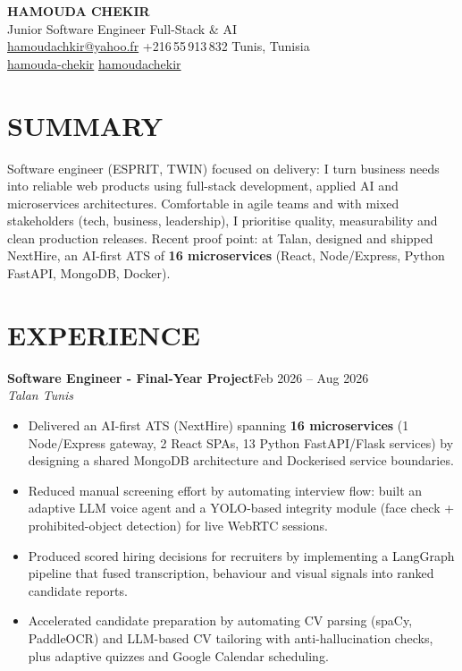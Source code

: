 \documentclass[10pt,a4paper]{article}
\newcommand{\TargetTitle}{Junior Software Engineer \textbar{} Full-Stack \& AI}
\newcommand{\job}[3]{%
 \textbf{\color{primary}#1}\hfill{\color{muted}\small #2}\\[-1pt]
 {\color{accent}\textit{#3}}\\[2pt]
 \begin{itemize}[leftmargin=0.85em, itemsep=1pt, topsep=0pt, parsep=0pt, partopsep=0pt]
}
\newcommand{\contactsep}{\hspace{5pt}{\color{rulecolor}|}\hspace{5pt}}
\begin{document}
{\fontsize{22}{26}\selectfont\bfseries\color{primary}HAMOUDA CHEKIR}\\[2pt]
{\large\color{accent}\TargetTitle}\\[4pt]
{\footnotesize\color{muted}%
 \hspace{3pt}\href{mailto:hamoudachkir@yahoo.fr}{hamoudachkir@yahoo.fr}%
 \contactsep
 \hspace{3pt}+216\,55\,913\,832%
 \contactsep
 \hspace{3pt}Tunis, Tunisia%
}\\[2pt]
{\footnotesize\color{muted}%
 \hspace{3pt}\href{https://www.linkedin.com/in/hamouda-chekir-5053572b4}{hamouda-chekir}%
 \contactsep
 \hspace{3pt}\href{https://github.com/hamoudachekir}{hamoudachekir}%
}\\[6pt]

\section{SUMMARY}
Software engineer (ESPRIT, TWIN) focused on delivery: I turn business needs into reliable web products using full-stack development, applied AI and microservices architectures.
Comfortable in agile teams and with mixed stakeholders (tech, business, leadership), I prioritise quality, measurability and clean production releases.
Recent proof point: at Talan, designed and shipped NextHire, an AI-first ATS of \textbf{16 microservices} (React, Node/Express, Python FastAPI, MongoDB, Docker).

\section{EXPERIENCE}

\job{Software Engineer - Final-Year Project}{Feb 2026 -- Aug 2026}{Talan \textbar{} Tunis}
 \item Delivered an AI-first ATS (NextHire) spanning \textbf{16 microservices} (1 Node/Express gateway, 2 React SPAs, 13 Python FastAPI/Flask services) by designing a shared MongoDB architecture and Dockerised service boundaries.
 \item Reduced manual screening effort by automating interview flow: built an adaptive LLM voice agent and a YOLO-based integrity module (face check + prohibited-object detection) for live WebRTC sessions.
 \item Produced scored hiring decisions for recruiters by implementing a LangGraph pipeline that fused transcription, behaviour and visual signals into ranked candidate reports.
 \item Accelerated candidate preparation by automating CV parsing (spaCy, PaddleOCR) and LLM-based CV tailoring with anti-hallucination checks, plus adaptive quizzes and Google Calendar scheduling.
\end{itemize}
\end{document}
